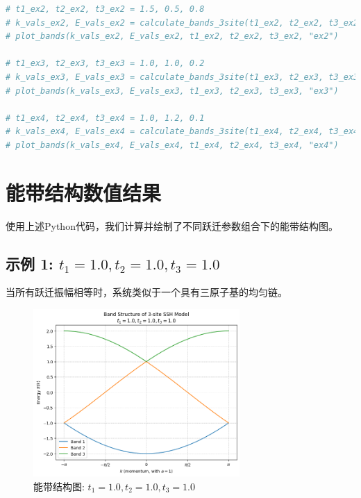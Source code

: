 \documentclass[UTF-8]{ctexart}
\begin{document}
\begin{lstlisting}[language=Python, caption=Python代码计算能带结构]
# t1_ex2, t2_ex2, t3_ex2 = 1.5, 0.5, 0.8
# k_vals_ex2, E_vals_ex2 = calculate_bands_3site(t1_ex2, t2_ex2, t3_ex2)
# plot_bands(k_vals_ex2, E_vals_ex2, t1_ex2, t2_ex2, t3_ex2, "ex2")

# t1_ex3, t2_ex3, t3_ex3 = 1.0, 1.0, 0.2
# k_vals_ex3, E_vals_ex3 = calculate_bands_3site(t1_ex3, t2_ex3, t3_ex3)
# plot_bands(k_vals_ex3, E_vals_ex3, t1_ex3, t2_ex3, t3_ex3, "ex3")

# t1_ex4, t2_ex4, t3_ex4 = 1.0, 1.2, 0.1
# k_vals_ex4, E_vals_ex4 = calculate_bands_3site(t1_ex4, t2_ex4, t3_ex4)
# plot_bands(k_vals_ex4, E_vals_ex4, t1_ex4, t2_ex4, t3_ex4, "ex4")
\end{lstlisting}

\section{能带结构数值结果}
使用上述Python代码，我们计算并绘制了不同跃迁参数组合下的能带结构图。

\subsection{示例 1: $t_1=1.0, t_2=1.0, t_3=1.0$}
当所有跃迁振幅相等时，系统类似于一个具有三原子基的均匀链。
\begin{figure}[H]
    \centering
    \includegraphics[width=0.7\textwidth]{band_structure_t1_1.0_t2_1.0_t3_1.0_ex1.png}
    \caption{能带结构图: $t_1=1.0, t_2=1.0, t_3=1.0$}
    \label{fig:band1}
\end{figure}
\end{document}
